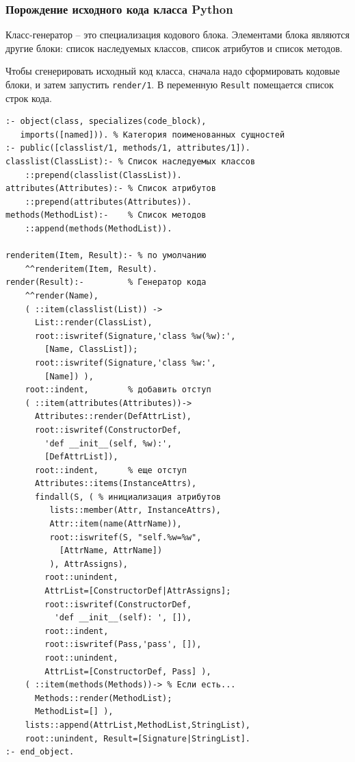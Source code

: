 \documentclass[10pt]{beamer}
\begin{document}
\begin{frame}[fragile]
  \frametitle{Порождение исходного кода класса Python}
  Класс-генератор -- это специализация кодового блока.  Элементами блока являются другие блоки: список наследуемых классов, список атрибутов и список методов.

  Чтобы сгенерировать исходный код класса, сначала надо сформировать кодовые блоки, и затем запустить \verb|render/1|. В переменную \verb|Result| помещается список строк кода.
\begin{multicols}{2}
\begin{verbatim}
:- object(class, specializes(code_block),
   imports([named])). % Категория поименованных сущностей
:- public([classlist/1, methods/1, attributes/1]).
classlist(ClassList):- % Список наследуемых классов
    ::prepend(classlist(ClassList)).
attributes(Attributes):- % Список атрибутов
    ::prepend(attributes(Attributes)).
methods(MethodList):-    % Список методов
    ::append(methods(MethodList)).

renderitem(Item, Result):- % по умолчанию
    ^^renderitem(Item, Result).
render(Result):-         % Генератор кода
    ^^render(Name),
    ( ::item(classlist(List)) ->
      List::render(ClassList),
      root::iswritef(Signature,'class %w(%w):',
        [Name, ClassList]);
      root::iswritef(Signature,'class %w:',
        [Name]) ),
    root::indent,        % добавить отступ
    ( ::item(attributes(Attributes))->
      Attributes::render(DefAttrList),
      root::iswritef(ConstructorDef,
        'def __init__(self, %w):',
        [DefAttrList]),
      root::indent,      % еще отступ
      Attributes::items(InstanceAttrs),
      findall(S, ( % инициализация атрибутов
         lists::member(Attr, InstanceAttrs),
         Attr::item(name(AttrName)),
         root::iswritef(S, "self.%w=%w",
           [AttrName, AttrName])
         ), AttrAssigns),
        root::unindent,
        AttrList=[ConstructorDef|AttrAssigns];
        root::iswritef(ConstructorDef,
          'def __init__(self): ', []),
        root::indent,
        root::iswritef(Pass,'pass', []),
        root::unindent,
        AttrList=[ConstructorDef, Pass] ),
    ( ::item(methods(Methods))-> % Если есть...
      Methods::render(MethodList);
      MethodList=[] ),
    lists::append(AttrList,MethodList,StringList),
    root::unindent, Result=[Signature|StringList].
:- end_object.
\end{verbatim}
\end{multicols}
\end{frame}
\end{document}
